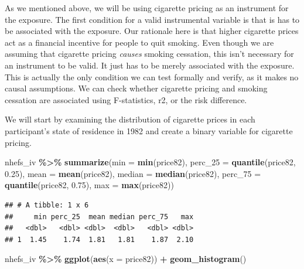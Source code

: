 \documentclass[
]{book}
\newenvironment{Shaded}{\begin{snugshade}}{\end{snugshade}}
\newcommand{\AttributeTok}[1]{\textcolor[rgb]{0.13,0.29,0.53}{#1}}
\newcommand{\FloatTok}[1]{\textcolor[rgb]{0.00,0.00,0.81}{#1}}
\newcommand{\FunctionTok}[1]{\textcolor[rgb]{0.13,0.29,0.53}{\textbf{#1}}}
\newcommand{\NormalTok}[1]{#1}
\newcommand{\SpecialCharTok}[1]{\textcolor[rgb]{0.81,0.36,0.00}{\textbf{#1}}}
\begin{document}
As we mentioned above, we will be using cigarette pricing as an instrument for the exposure. The first condition for a valid instrumental variable is that is has to be associated with the exposure. Our rationale here is that higher cigarette prices act as a financial incentive for people to quit smoking. Even though we are assuming that cigarette pricing \emph{causes} smoking cessation, this isn't necessary for an instrument to be valid. It just has to be merely associated with the exposure. This is actually the only condition we can test formally and verify, as it makes no causal assumptions. We can check whether cigarette pricing and smoking cessation are associated using F-statistics, r2, or the risk difference.

We will start by examining the distribution of cigarette prices in each participant's state of residence in 1982 and create a binary variable for cigarette pricing.

\begin{Shaded}
\begin{Highlighting}[]
\NormalTok{nhefs\_iv }\SpecialCharTok{\%\textgreater{}\%} 
  \FunctionTok{summarize}\NormalTok{(}\AttributeTok{min =} \FunctionTok{min}\NormalTok{(price82), }
            \AttributeTok{perc\_25 =} \FunctionTok{quantile}\NormalTok{(price82, }\FloatTok{0.25}\NormalTok{), }
            \AttributeTok{mean =} \FunctionTok{mean}\NormalTok{(price82), }
            \AttributeTok{median =} \FunctionTok{median}\NormalTok{(price82),}
            \AttributeTok{perc\_75 =} \FunctionTok{quantile}\NormalTok{(price82, }\FloatTok{0.75}\NormalTok{), }
            \AttributeTok{max =} \FunctionTok{max}\NormalTok{(price82))}
\end{Highlighting}
\end{Shaded}

\begin{verbatim}
## # A tibble: 1 x 6
##     min perc_25  mean median perc_75   max
##   <dbl>   <dbl> <dbl>  <dbl>   <dbl> <dbl>
## 1  1.45    1.74  1.81   1.81    1.87  2.10
\end{verbatim}

\begin{Shaded}
\begin{Highlighting}[]
\NormalTok{nhefs\_iv }\SpecialCharTok{\%\textgreater{}\%} 
  \FunctionTok{ggplot}\NormalTok{(}\FunctionTok{aes}\NormalTok{(}\AttributeTok{x =}\NormalTok{ price82)) }\SpecialCharTok{+} 
  \FunctionTok{geom\_histogram}\NormalTok{()}
\end{Highlighting}
\end{Shaded}
\end{document}
